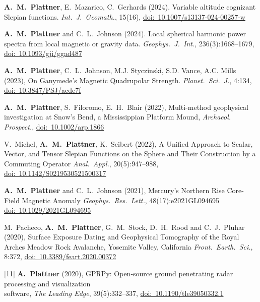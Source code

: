 \documentclass[10pt]{article}
\begin{document}
\spcp
\shift[18] \textbf{A.~M.~Plattner}, E.\ Mazarico, C.\ Gerhards (2024). Variable altitude cognizant Slepian functions. \emph{Int.~J.~Geomath.}, 15(16), \href{https://doi.org/10.1007/s13137-024-00257-w}{doi:~10.1007/s13137-024-00257-w}

\spcp
\shift[17] \textbf{A.~M.~Plattner} and C.\ L.~Johnson (2024). Local spherical harmonic power spectra from local magnetic or gravity data. \emph{Geophys.~J.~Int.}, 236(3):1668--1679,  \href{https://doi.org/10.1093/gji/ggad487}{doi:~10.1093/gji/ggad487} 

\spcp
\shift[16] \textbf{A.~M.~Plattner}, C.\ L.~Johnson, M.J. Styczinski, S.D. Vance, A.C. Mills (2023), On Ganymede's Magnetic Quadrupolar Strength. \emph{Planet.\ Sci.\ J.}, 4:134, \href{https://doi.org/10.3847/PSJ/acde7f}{doi:~10.3847/PSJ/acde7f} 


\spcp
\shift[15] \textbf{A.~M.~Plattner}, S.~Filoromo, E.~H.~Blair (2022), Multi-method geophysical
investigation at Snow's Bend, a Mississippian Platform Mound,
\emph{Archaeol. Prospect.}, \href{https://doi.org/10.1002/arp.1866}{doi:~10.1002/arp.1866}

\spcp
\shift[14] V.~Michel, \textbf{A.~M.~Plattner}, K.~Seibert (2022),
A Unified Approach to Scalar, Vector, and Tensor Slepian Functions on the Sphere and Their Construction by a Commuting Operator
\emph{Anal.~Appl.}, 20(5):947--988, \href{https://doi.org/10.1142/S0219530521500317}{doi:~10.1142/S0219530521500317}

\spcp
\shift[13] \textbf{A.~M.~Plattner} and C.\ L.~Johnson (2021),
Mercury's Northern Rise Core-Field Magnetic Anomaly
\emph{Geophys.~Res.~Lett.}, 48(17):e2021GL094695 \href{https://doi.org/10.1029/2021GL094695}{doi:~10.1029/2021GL094695}

\spcp
\grshift \gr[12] M.~Pacheco, \textbf{A.~M.~Plattner}, G.~M.~Stock, D.~H.~Rood and C.~J.~Pluhar (2020),
Surface Exposure Dating and Geophysical Tomography of the Royal Arches Meadow Rock Avalanche, Yosemite Valley, California
\emph{Front.~Earth.~Sci.}, 8:372, \href{https://www.frontiersin.org/articles/10.3389/feart.2020.00372/full}{doi:~10.3389/feart.2020.00372} 

\spcp
\hspace{-0.675cm}[11] \textbf{A.~Plattner} (2020), GPRPy: Open-source ground penetrating radar processing and visualization \\software, \emph{The Leading Edge}, 39(5):332--337, \href{https://doi.org/10.1190/tle39050332.1}{doi:~10.1190/tle39050332.1}
\end{document}

